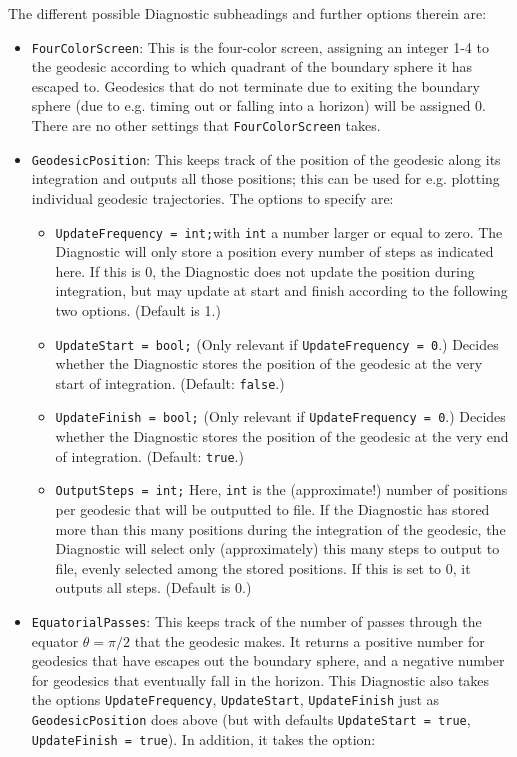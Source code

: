 \documentclass[11pt,a4paper]{article}
\newcommand{\code}[1]{{\tt #1}}
\begin{document}
The different possible Diagnostic subheadings and further options therein are:
\begin{itemize}
 \item \code{FourColorScreen}: This is the four-color screen, assigning an integer 1-4 to the geodesic according to which quadrant of the boundary sphere it has escaped to. Geodesics that do not terminate due to exiting the boundary sphere (due to e.g. timing out or falling into a horizon) will be assigned 0. There are no other settings that \code{FourColorScreen} takes.
 \item \code{GeodesicPosition}: This keeps track of the position of the geodesic along its integration and outputs all those positions; this can be used for e.g. plotting individual geodesic trajectories. The options to specify are:
 \begin{itemize}
 \item \code{UpdateFrequency = int;}\newline with \code{int} a number larger or equal to zero. The Diagnostic will only store a position every number of steps as indicated here. If this is 0, the Diagnostic does not update the position during integration, but may update at start and finish according to the following two options. (Default is 1.)
 \item \code{UpdateStart = bool;} \newline (Only relevant if \code{UpdateFrequency = 0}.) Decides whether the Diagnostic stores the position of the geodesic at the very start of integration. (Default: \code{false}.)
 \item \code{UpdateFinish = bool;} \newline (Only relevant if \code{UpdateFrequency = 0}.) Decides whether the Diagnostic stores the position of the geodesic at the very end of integration. (Default: \code{true}.)
 \item \code{OutputSteps = int;} \newline Here, \code{int} is the (approximate!) number of positions per geodesic that will be outputted to file. If the Diagnostic has stored more than this many positions during the integration of the geodesic, the Diagnostic will select only (approximately) this many steps to output to file, evenly selected among the stored positions. If this is set to 0, it outputs all steps. (Default is 0.)
\end{itemize}
\item \code{EquatorialPasses}: This keeps track of the number of passes through the equator $\theta=\pi/2$ that the geodesic makes. It returns a positive number for geodesics that have escapes out the boundary sphere, and a negative number for geodesics that eventually fall in the horizon. This Diagnostic also takes the options \code{UpdateFrequency}, \code{UpdateStart}, \code{UpdateFinish} just as \code{GeodesicPosition} does above (but with defaults \code{UpdateStart = true}, \code{UpdateFinish = true}). In addition, it takes the option:

\end{itemize}
\end{document}

